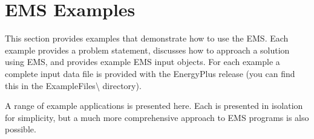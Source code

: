 \chapter{EMS Examples}\label{ems-examples}

This section provides examples that demonstrate how to use the EMS. Each example provides a problem statement, discusses how to approach a solution using EMS, and provides example EMS input objects. For each example a complete input data file is provided with the EnergyPlus release (you can find this in the ExampleFiles\textbackslash{} directory).

A range of example applications is presented here. Each is presented in isolation for simplicity, but a much more comprehensive approach to EMS programs is also possible.
